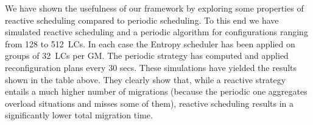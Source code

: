 We have shown the usefulness of our framework by exploring some
properties of reactive scheduling compared to periodic scheduling. To
this end we have simulated reactive scheduling and a periodic
algorithm for configurations ranging from 128 to 512~LCs. In each case
the Entropy scheduler has been applied on groups of 32~LCs per GM. The
periodic strategy has computed and applied reconfiguration plans every
30 secs. These simulations have yielded the results shown in the table
above. They clearly show that, while a reactive strategy entails a
much higher number of migrations (because the periodic one aggregates
overload situations and misses some of them), reactive scheduling
results in a significantly lower total migration time.








